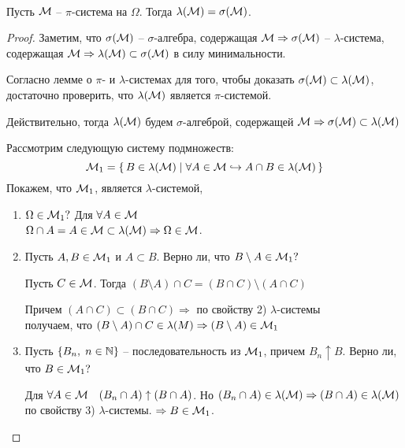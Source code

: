 \begin{theorem}~

	Пусть $\mathcal{M}$ -- $\pi$-система на $\Omega$. Тогда $\lambda(\mathcal{M}) = \sigma(\mathcal{M})$.

\end{theorem}

\begin{proof}
	Заметим, что $\sigma(\mathcal{M})$ -- $\sigma$-алгебра, содержащая $\mathcal{M} \Rightarrow \sigma(\mathcal{M})$ -- 
	$\lambda$-система, содержащая $\mathcal{M} \Rightarrow \lambda(\mathcal{M}) \subset \sigma(\mathcal{M})$ 
	в силу минимальности.
	
	Согласно лемме о $\pi$- и $\lambda$-системах для того, чтобы доказать 
	$\sigma(\mathcal{M}) \subset \lambda(\mathcal{M})$, достаточно проверить, что $\lambda(\mathcal{M})$ 
	является $\pi$-системой.
	
	Действительно, тогда $\lambda(\mathcal{M})$  будем $\sigma$-алгеброй, 
	содержащей $\mathcal{M} \Rightarrow \sigma(\mathcal{M}) \subset \lambda(\mathcal{M})$
	
	Рассмотрим следующую систему подмножеств:
	\begin{equation*}
		\mathcal{M}_1 = \left\{ \,  B \in \lambda(\mathcal{M}) \mid \forall A \in \mathcal{M} \hookrightarrow A \cap B \in \lambda(\mathcal{M}) \, \right\}
	\end{equation*}
	Покажем, что $\mathcal{M}_1$, является $\lambda$-системой,
	
	\begin{enumerate}
		\item 
			$\Omega \in \mathcal{M}_1 ?$ Для $\forall A \in \mathcal{M}$\\
			$\Omega \cap A = A \in \mathcal{M} \subset \lambda(\mathcal{M}) \Rightarrow \Omega \in \mathcal{M}$.
		
		\item 
			Пусть $A, B \in \mathcal{M}_1$ и $A \subset B$. 
			Верно ли, что $B \setminus A \in \mathcal{M}_1 ?$

			Пусть $C \in \mathcal{M}$. Тогда $(B \setminus A) \cap C = (B \cap C) \setminus (A \cap C)$

			Причем $(A \cap C) \subset (B \cap C) \Rightarrow$ по свойству 2) $\lambda$-системы\\
			получаем, что $(B \setminus A) \cap C \in \lambda(M) \Rightarrow (B \setminus A) \in \mathcal{M}_1$
			
		\item 
			Пусть $\left\{ B_n,\; n \in \mathbb{N} \right\}$ -- последовательность из $\mathcal{M}_1$, 
			причем $B_n \uparrow B$. Верно ли, что $B \in \mathcal{M}_1 ?$

			Для $\forall A \in \mathcal{M} \quad (B_n \cap A) \uparrow (B \cap A)$. 
			Но $(B_n \cap A) \in \lambda(\mathcal{M}) \Rightarrow (B \cap A) \in \lambda(\mathcal{M})$ 
			по свойству 3) $\lambda$-системы. $\Rightarrow B \in \mathcal{M}_1$.


\end{enumerate}
\end{proof}
